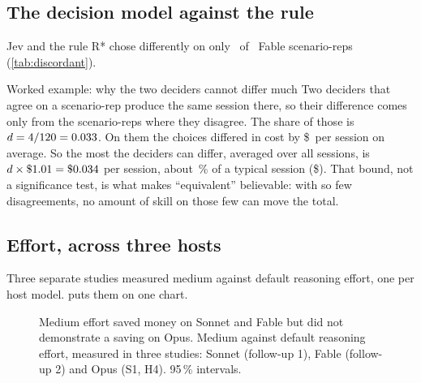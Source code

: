 \subsection{The decision model against the rule}\label{sec:bound}

Jev and the rule R* chose differently on only \DcN\ of \DcUnits\ Fable scenario-reps (\cref{tab:discordant}).

\begin{table}[htbp]
\centering\small
\caption{The \DcN\ S1 scenario-reps on which the decision model (Jev) and the rule R* chose different session
models, with what each choice cost and how it scored.}
\label{tab:discordant}

\end{table}

\begin{casecard}{Worked example: why the two deciders cannot differ much}
Two deciders that agree on a scenario-rep produce the same session there, so their difference comes only from the
scenario-reps where they disagree. The share of those is $d = 4/120 = 0.033$. On them the choices differed in
cost by \$\DcMeanAbsDiff\ per session on average. So the most the deciders can differ, averaged over all sessions, is
$d \times \$1.01 = \$0.034$ per session, about \DcBoundPct\,\% of a typical session (\$\DcMeanCost).
That bound, not a significance test, is what makes ``equivalent'' believable: with so few disagreements, no amount of
skill on those few can move the total.
\end{casecard}

\subsection{Effort, across three hosts}

Three separate studies measured medium against default reasoning effort, one per host model.  puts them on one chart.

\begin{figure}[htbp]
\centering
{}\par\smallskip

\caption{Medium effort saved money on Sonnet and Fable but did not demonstrate a saving on Opus. Medium against default reasoning effort, measured in three studies: Sonnet (follow-up 1), Fable (follow-up
2) and Opus (S1, H4). 95\,\% intervals.}
\label{fig:effort}
\end{figure}

